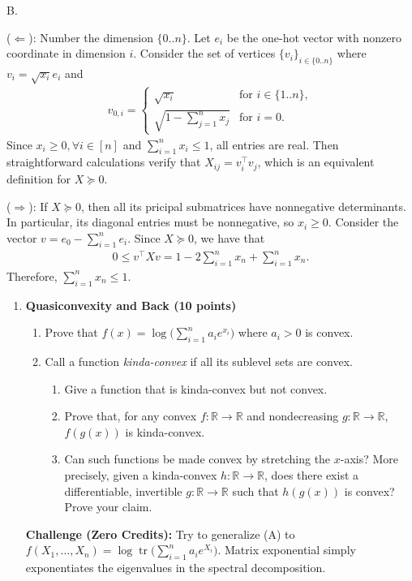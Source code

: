 \documentclass[11pt,letterpaper]{article}
\theoremstyle{definition}
\newcommand{\reals}{\mathbb{R}}
\begin{document}
B.

($\Leftarrow$):
Number the dimension $\{0..n\}$.
Let $e_i$ be the one-hot vector with nonzero coordinate in dimension $i$.
Consider the set of vertices $\{v_i\}_{i\in\{0..n\}}$ where $v_i = \sqrt{x_i} e_i$ and 
\begin{align*}
    v_{0,i} = \begin{cases}
        \sqrt{x_i} &\text{for }i\in \{1..n\}, \\
        \sqrt{1-\sum_{j=1}^n x_j} &\text{for }i=0.
    \end{cases}
\end{align*}
Since $x_i \geq 0, \forall i \in [n]$ and $\sum_{i=1}^n x_i \leq 1$, all entries are real.
Then straightforward calculations verify that $X_{ij} = v_i^\top v_j$, which is an equivalent definition for $X\succeq 0$.

($\Rightarrow$):
If $X\succeq 0$, then all its pricipal submatrices have nonnegative determinants.
In particular, its diagonal entries must be nonnegative, so $x_i\geq 0$. 
Consider the vector $v=e_0-\sum_{i=1}^n e_i$.
Since $X\succeq 0$, we have that
\begin{align*}
    0\leq v^\top X v = 1 - 2 \sum_{i=1}^n x_n + \sum_{i=1}^n x_n.
\end{align*}
Therefore, $\sum_{i=1}^n x_n\leq 1$.


\begin{enumerate}[resume=q]
\item \textbf{Quasiconvexity and Back (10 points)}
\begin{enumerate}[label=\textbf{Part \Alph*.}, leftmargin=*]
\item Prove that $f(x) = \log\bigl(\sum_{i=1}^n a_i e^{x_i}\bigr)$ where $a_i > 0$ is convex.
\item Call a function \emph{kinda-convex} if all its sublevel sets are convex.
\begin{enumerate}[label=\arabic*.]
\item Give a function that is kinda-convex but not convex.
\item Prove that, for any convex $f : \reals \to \reals$ and nondecreasing $g : \reals \to \reals$, $f(g(x))$ is kinda-convex.
\item Can such functions be made convex by stretching the $x$-axis? More precisely, given a kinda-convex $h : \reals \to \reals$, does there exist a differentiable, invertible $g : \reals \to \reals$ such that $h(g(x))$ is convex? Prove your claim.
\end{enumerate}
\end{enumerate}

\textbf{Challenge (Zero Credits):} Try to generalize (A) to $f(X_1, \ldots, X_n) = \log \operatorname{tr}\bigl(\sum_{i=1}^n a_i e^{X_i}\bigr)$. Matrix exponential simply exponentiates the eigenvalues in the spectral decomposition.
\end{enumerate}
\end{document}
